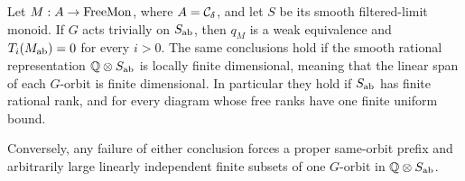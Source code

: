 \begin{proposition}\label{G:boundedrank}
Let $M:A\to\mathrm{FreeMon}$, where $A=\mathcal C_\delta$, and let $S$ be its
smooth filtered-limit monoid.  If $G$ acts trivially on
$S_{\mathrm{ab}}$, then $q_M$ is a weak equivalence and
$T_i(M_{\mathrm{ab}})=0$ for every $i>0$.
The same conclusions hold if the smooth rational representation
$\mathbb Q\otimes S_{\mathrm{ab}}$ is locally finite dimensional, meaning that
the linear span of each $G$-orbit is finite dimensional.
In particular they hold if $S_{\mathrm{ab}}$ has finite rational rank,
and for every diagram whose free ranks have one finite uniform
bound.

Conversely, any failure of either conclusion forces a proper
same-orbit prefix and arbitrarily large linearly independent
finite subsets of one $G$-orbit in $\mathbb Q\otimes S_{\mathrm{ab}}$.
\end{proposition}
